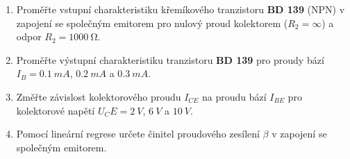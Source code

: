 \documentclass[0-protokol.tex]{subfiles}
\begin{document}
\begin{enumerate}
\item Proměřte vstupní charakteristiku křemíkového tranzistoru \textbf{BD 139} (NPN) v zapojení se společným emitorem pro nulový proud kolektorem ($R_2 = \infty$) a odpor $R_2 = \SI{1000}{\ohm}$.
\item Proměřte výstupní charakteristiku tranzistoru \textbf{BD 139} pro proudy bází $I_B = \SI{0,1}{mA}$, $\SI{0.2}{mA}$ a $\SI{0.3}{mA}$.
\item Změřte závislost kolektorového proudu $I_{CE}$ na proudu bází $I_{BE}$ pro kolektorové napětí $U_CE = \SI{2}{V}$, $\SI{6}{V}$ a $\SI{10}{V}$.
\item Pomocí lineární regrese určete činitel proudového zesílení $\beta$ v zapojení se společným emitorem.
\end{enumerate}
\end{document}
